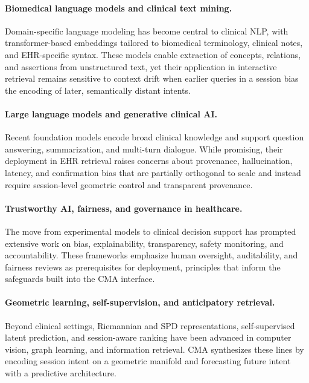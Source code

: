 \documentclass[preprint,12pt]{elsarticle}
\begin{document}
\paragraph{Biomedical language models and clinical text mining.}
Domain-specific language modeling has become central to clinical NLP, with transformer-based embeddings tailored to biomedical terminology, clinical notes, and EHR-specific syntax. \citep{zhou22,yao25,urooj25,chen25,nazi24,chow25,AlSaad2024Multimodal,Nagarajan2024Economics,Zhang2025Revolutionizing,yang25,mcduff25,mehandru24,zhou25,zhou25a} These models enable extraction of concepts, relations, and assertions from unstructured text, yet their application in interactive retrieval remains sensitive to context drift when earlier queries in a session bias the encoding of later, semantically distant intents.

\paragraph{Large language models and generative clinical AI.}
Recent foundation models encode broad clinical knowledge and support question answering, summarization, and multi-turn dialogue. \citep{logan2026,agweyu25,ying00,chen25a} While promising, their deployment in EHR retrieval raises concerns about provenance, hallucination, latency, and confirmation bias that are partially orthogonal to scale and instead require session-level geometric control and transparent provenance.

\paragraph{Trustworthy AI, fairness, and governance in healthcare.}
The move from experimental models to clinical decision support has prompted extensive work on bias, explainability, transparency, safety monitoring, and accountability. \citep{limaye20,association25,ordez26,haick26,nouis25} These frameworks emphasize human oversight, auditability, and fairness reviews as prerequisites for deployment, principles that inform the safeguards built into the CMA interface.

\paragraph{Geometric learning, self-supervision, and anticipatory retrieval.}
Beyond clinical settings, Riemannian and SPD representations, self-supervised latent prediction, and session-aware ranking have been advanced in computer vision, graph learning, and information retrieval. \citep{oord18,hong25,papachappa26,bakas26,al20,cma2026a} CMA synthesizes these lines by encoding session intent on a geometric manifold and forecasting future intent with a predictive architecture.
\end{document}
